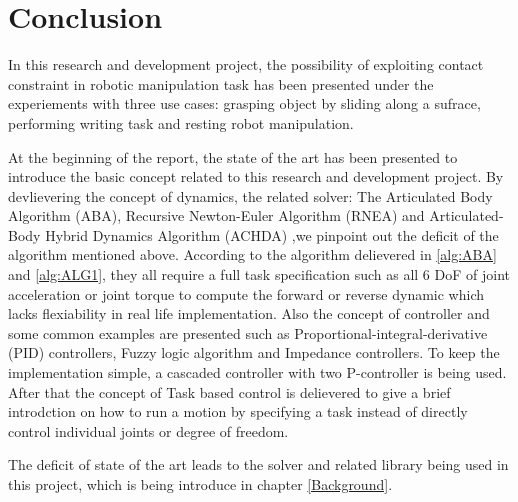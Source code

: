\documentclass[report.tex]{subfiles}
\begin{document}
\chapter{Conclusion}
In this research and development project, the possibility of exploiting contact constraint in robotic manipulation task has been presented under the experiements with three use cases: grasping object by sliding along a sufrace, performing writing task and resting robot manipulation.

At the beginning of the report, the state of the art has been presented to introduce the basic concept related to this research and development project. By devlievering the concept of dynamics, the related solver: The Articulated Body Algorithm (ABA), Recursive Newton-Euler Algorithm (RNEA) and Articulated-Body Hybrid Dynamics Algorithm (ACHDA) ,we pinpoint out the deficit of the algorithm mentioned above. According to the algorithm delievered in \ref{alg:ABA} and \ref{alg:ALG1}, they all require a full task specification such as all 6 DoF of joint acceleration or joint torque to compute the forward or reverse dynamic which lacks flexiability in real life implementation. Also the concept of controller and some common examples are presented such as Proportional-integral-derivative (PID) controllers, Fuzzy logic algorithm and Impedance controllers. To keep the implementation simple, a cascaded controller with two P-controller is being used. After that the concept of Task based control is delievered to give a brief introdction on how to run a motion by specifying a task instead of directly control individual joints or degree of freedom.

The deficit of state of the art leads to the solver and related library being used in this project, which is being introduce in chapter \ref{Background}.
\end{document}
